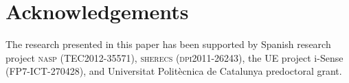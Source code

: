 









\section{Acknowledgements}

The research presented in this paper has been supported by Spanish
research project \textsc{nasp (TEC2012-35571)}, \textsc{sherecs
  (dpi2011-26243)}, the UE project i-Sense ({\small FP7-ICT-270428}),
and Universitat Polit\`{e}cnica de Catalunya predoctoral grant.







